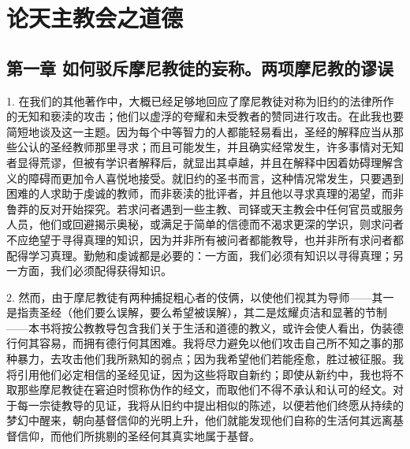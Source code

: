 
\chapter{论天主教会之道德}


\par

\par


\section{第一章 如何驳斥摩尼教徒的妄称。两项摩尼教的谬误}

1. 在我们的其他著作中，大概已经足够地回应了摩尼教徒对称为旧约的法律所作的无知和亵渎的攻击；他们以虚浮的夸耀和未受教者的赞同进行攻击。在此我也要简短地谈及这一主题。因为每个中等智力的人都能轻易看出，圣经的解释应当从那些公认的圣经教师那里寻求；而且可能发生，并且确实经常发生，许多事情对无知者显得荒谬，但被有学识者解释后，就显出其卓越，并且在解释中因着妨碍理解含义的障碍而更加令人喜悦地接受。就旧约的圣书而言，这种情况常发生，只要遇到困难的人求助于虔诚的教师，而非亵渎的批评者，并且他以寻求真理的渴望，而非鲁莽的反对开始探究。若求问者遇到一些主教、司铎或天主教会中任何官员或服务人员，他们或回避揭示奥秘，或满足于简单的信德而不渴求更深的学识，则求问者不应绝望于寻得真理的知识，因为并非所有被问者都能教导，也并非所有求问者都配得学习真理。勤勉和虔诚都是必要的：一方面，我们必须有知识以寻得真理；另一方面，我们必须配得获得知识。\par

2. 然而，由于摩尼教徒有两种捕捉粗心者的伎俩，以使他们视其为导师——其一是指责圣经（他们要么误解，要么希望被误解），其二是炫耀贞洁和显著的节制——本书将按公教教导包含我们关于生活和道德的教义，或许会使人看出，伪装德行何其容易，而拥有德行何其困难。我将尽力避免以他们攻击自己所不知之事的那种暴力，去攻击他们我所熟知的弱点；因为我希望他们若能痊愈，胜过被征服。我将引用他们必定相信的圣经见证，因为这些将取自新约；即使从新约中，我也将不取那些摩尼教徒在窘迫时惯称伪作的经文，而取他们不得不承认和认可的经文。对于每一宗徒教导的见证，我将从旧约中提出相似的陈述，以便若他们终愿从持续的梦幻中醒来，朝向基督信仰的光明上升，他们就能发现他们自称的生活何其远离基督信仰，而他们所挑剔的圣经何其真实地属于基督。\par

